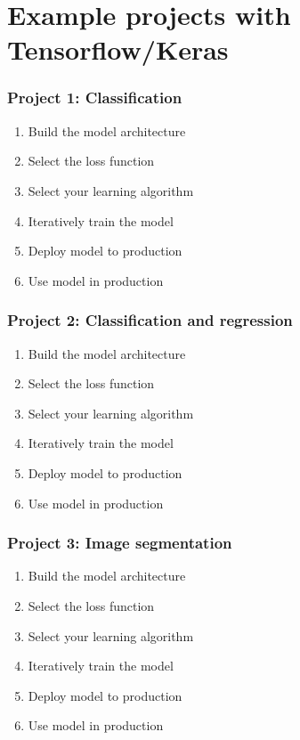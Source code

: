 \documentclass{beamer}
\begin{document}
\section{Example projects with Tensorflow/Keras}
\begin{frame}
\frametitle{Project 1: Classification}
\begin{example}
\begin{enumerate}
\item Build the model architecture 
\item Select the loss function
\item Select your learning algorithm
\item Iteratively train the model
\item Deploy model to production
\item Use model in production
\end{enumerate}
\end{example}
\end{frame}

\begin{frame}
\frametitle{Project 2: Classification and regression}
\begin{example}
\begin{enumerate}
\item Build the model architecture 
\item Select the loss function
\item Select your learning algorithm
\item Iteratively train the model
\item Deploy model to production
\item Use model in production
\end{enumerate}
\end{example}
\end{frame}


\begin{frame}
\frametitle{Project 3: Image segmentation}
\begin{example}
\begin{enumerate}
\item Build the model architecture 
\item Select the loss function
\item Select your learning algorithm
\item Iteratively train the model
\item Deploy model to production
\item Use model in production
\end{enumerate}
\end{example}
\end{frame}
\end{document}
